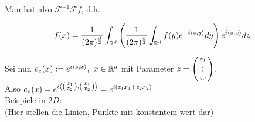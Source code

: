     Man hat also $\mathcal F^{-1} \mathcal F f$, d.h.

    \[f(x) = \frac{1}{(2 \pi)^\frac{d}{2}} \int_{\mathbb{R}^d} \left(\frac{1}{(2 \pi)^\frac{d}{2}} \int_{\mathbb{R}^d} f(y) e^{-i \left \langle z,y \right \rangle} dy\right) e^{i \left \langle z,x \right \rangle} dz\]

    Sei nun $e_z(x) := e^{i \left \langle z,x \right \rangle}, \ x \in \mathbb{R}^d$ mit Parameter
$z = \left( \begin{smallmatrix} z_1 \\ \vdots \\ z_d \end{smallmatrix} \right)$.\\
    Also $e_z(x) = e^{i\left \langle \left( \begin{smallmatrix} z_1\\z_2 \end{smallmatrix} \right),\left( \begin{smallmatrix} x_1\\x_2 \end{smallmatrix} \right) \right \rangle} = e^{i (z_1 x_1 +z_2 x_2)}$\\
    Beispiele in $2D$:\\
    (Hier stellen die Linien, Punkte mit konstantem wert dar)

